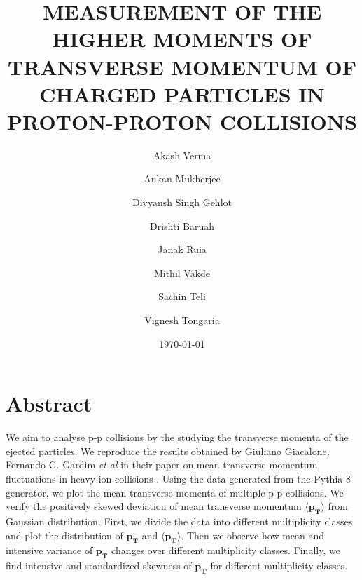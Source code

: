 \documentclass[letterpaper,aps,prc,superscriptaddress,nofootinbib,10pt,showpacs,floatfix]{revtex4-2}%
\begin{document}
\title{MEASUREMENT OF THE HIGHER MOMENTS OF TRANSVERSE MOMENTUM OF CHARGED PARTICLES IN PROTON-PROTON COLLISIONS}
\author{Akash Verma}
\author{Ankan Mukherjee} 
\author{Divyansh Singh Gehlot}
\author{Drishti Baruah}
\author{Janak Ruia}
\author{Mithil Vakde}
\author{Sachin Teli}
\author{Vignesh Tongaria}


\date{\today}  



\maketitle
\vspace{-10mm}
\section*{Abstract}
\vspace{-2mm}
\begin{adjustwidth}{20pt}{20pt}
We aim to analyse p-p collisions by the studying the transverse momenta of the ejected particles. We reproduce the results obtained by Giuliano Giacalone, Fernando G. Gardim {\it et al} in their paper on mean transverse momentum fluctuations in heavy-ion collisions \cite{fluct}. Using the data generated from the Pythia 8 generator, we plot the mean transverse momenta of multiple p-p collisions. We verify the positively skewed deviation of mean transverse momentum $\mathbf{\langle p_T \rangle}$  from Gaussian distribution. First, we divide the data into different multiplicity classes and plot the distribution of $\mathbf{p_T}$ and $\mathbf{\langle  p_T\rangle}$. Then we observe how mean and intensive variance of $\mathbf{p_T}$ changes over different multiplicity classes. Finally, we find intensive and standardized skewness of $\mathbf{p_T}$ for different multiplicity classes. 
\end{adjustwidth}
\end{document}
